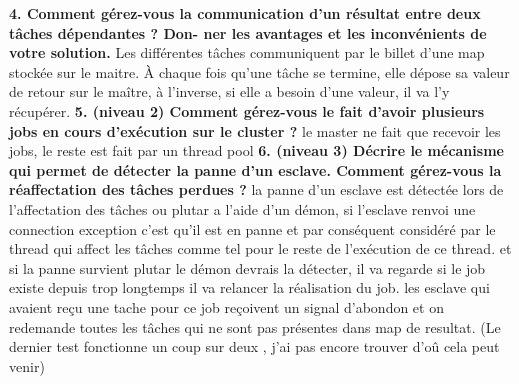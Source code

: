 \documentclass{article}
\begin{document}
\newline
\newline
\textbf{4. Comment gérez-vous la communication d’un résultat entre deux tâches dépendantes ? Don-
ner les avantages et les inconvénients de votre solution.}
\newline
\newline
Les différentes tâches communiquent par le billet d'une map stockée sur le maitre. 
À chaque fois qu'une tâche se termine, elle dépose sa valeur de retour sur le maître, à l'inverse, si elle a besoin d'une valeur, il va l'y récupérer. 
\newline
\newline
\textbf{5. (niveau 2) Comment gérez-vous le fait d’avoir plusieurs jobs en cours d’exécution sur le
cluster ?}
\newline
\newline
le master ne fait que recevoir les jobs, le reste est fait par un thread pool
\newline
\newline
\textbf{6. (niveau 3) Décrire le mécanisme qui permet de détecter la panne d’un esclave. Comment
gérez-vous la réaffectation des tâches perdues ?}
\newline
\newline
la panne d'un esclave est détectée lors de l'affectation des tâches ou plutar a l'aide d'un démon, si l'esclave renvoi une connection exception c'est qu'il est en panne 
et par conséquent considéré par le thread qui affect les tâches comme tel pour le reste de l'exécution de ce thread.
et si la panne survient plutar le démon devrais la détecter, il va regarde si le job existe depuis trop longtemps il va relancer la réalisation du job.
\newline
les esclave qui avaient reçu une tache pour ce job reçoivent un signal d'abondon et on redemande toutes les tâches qui ne sont pas présentes dans map de resultat.
\newline
\newline
(Le dernier test fonctionne un coup sur deux , j'ai pas encore trouver d'oû cela peut venir)
\end{document}
